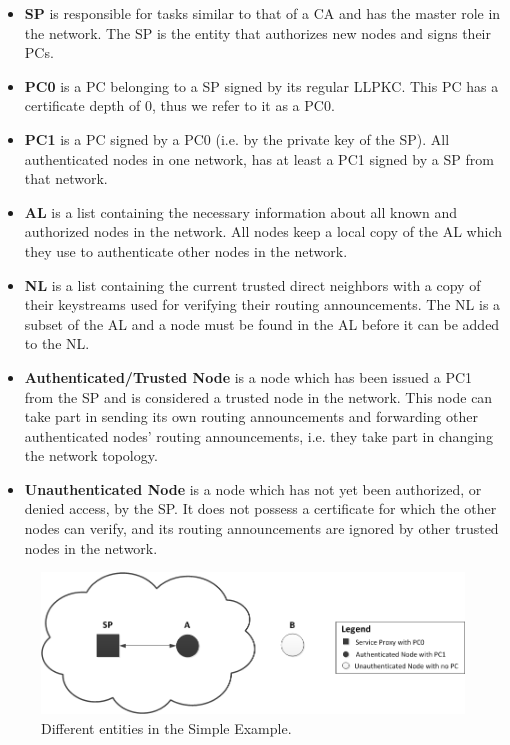 \begin{itemize}
  \item \textbf{\acf{SP}} is responsible for tasks similar to that of a \ac{CA}
  	and has the master role in the network. The \ac{SP} is the entity that
 	authorizes new nodes and signs their \acp{PC}.
  \item \textbf{\acf{PC0}} is a \ac{PC} belonging to a \ac{SP} signed by its
    regular \ac{LLPKC}. This \ac{PC} has a certificate depth of 0, thus we refer
    to it as a \ac{PC0}.
  \item \textbf{\acf{PC1}} is a \ac{PC} signed by a \ac{PC0} (i.e. by the
    private key of the \ac{SP}). All authenticated nodes in one network, has at
    least a \ac{PC1} signed by a \ac{SP} from that network.
  \item \textbf{\acf{AL}} is a list containing the necessary information about
 	all known and authorized nodes in the network. All nodes keep a local copy of
 	the \ac{AL} which they use to authenticate other nodes in the network.
  \item \textbf{\acf{NL}} is a list containing the current trusted direct
    neighbors with a copy of their keystreams used for verifying their routing
    announcements. The \ac{NL} is a subset of the \ac{AL} and a node must be
    found in the \ac{AL} before it can be added to the \ac{NL}.
  \item \textbf{Authenticated/Trusted Node} is a node which has been issued a
    \ac{PC1} from the \ac{SP} and is considered a trusted node in the network.
    This node can take part in sending its own routing announcements and
    forwarding other authenticated nodes' routing announcements, i.e. they take
    part in changing the network topology.
  \item \textbf{Unauthenticated Node} is a node which has not yet been
    authorized, or denied access, by the \ac{SP}. It does not possess a
    certificate for which the other nodes can verify, and its routing
    announcements are ignored by other trusted nodes in the network.
\end{itemize}

\begin{figure}[h]
	\centering
  	\includegraphics[width=\textwidth]{images/simple_example_entities.png}
  	\caption{Different entities in the Simple Example.}
	\label{fig:simple_example_entities}
\end{figure}

